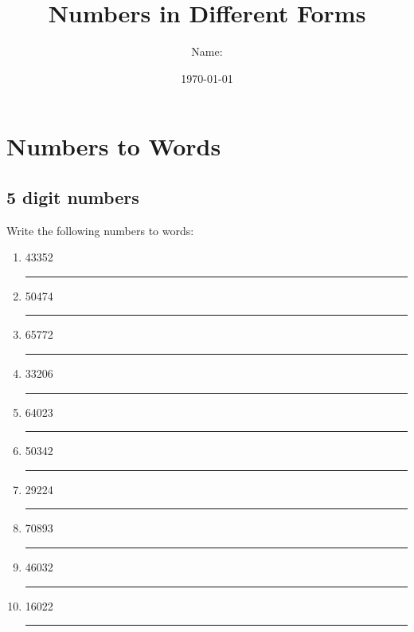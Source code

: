 \documentclass[11pt]{article}
\title{Numbers in Different Forms}
\author{Name: \rule[-5pt]{5cm}{0.5pt}}
\date{\today}
\begin{document}
\thispagestyle{empty}
\maketitle
\newpage
{}

\section{Numbers to Words}

\subsection{5 digit numbers}

Write the following numbers to words:
{
\begin{enumerate}[nosep]
    \setlength{\parskip}{5pt}
    \item 43352 \\
    \rule{0cm}{20pt}\rule[0cm]{10cm}{0.4pt}
    \item 50474 \\
    \rule{0cm}{20pt}\rule[0cm]{10cm}{0.4pt}
    \item 65772 \\
    \rule{0cm}{20pt}\rule[0cm]{10cm}{0.4pt}
    \item 33206 \\
    \rule{0cm}{20pt}\rule[0cm]{10cm}{0.4pt}
    \item 64023 \\
    \rule{0cm}{20pt}\rule[0cm]{10cm}{0.4pt}
    \item 50342 \\
    \rule{0cm}{20pt}\rule[0cm]{10cm}{0.4pt}
    \item 29224 \\
    \rule{0cm}{20pt}\rule[0cm]{10cm}{0.4pt}
    \item 70893 \\
    \rule{0cm}{20pt}\rule[0cm]{10cm}{0.4pt}
    \item 46032 \\
    \rule{0cm}{20pt}\rule[0cm]{10cm}{0.4pt}
    \item 16022 \\
    \rule{0cm}{20pt}\rule[0cm]{10cm}{0.4pt}
\end{enumerate}
}

\newpage
\end{document}
